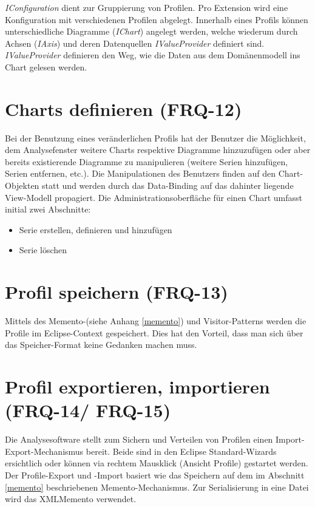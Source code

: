\textit{IConfiguration} dient zur Gruppierung von Profilen. Pro Extension wird eine Konfiguration mit verschiedenen Profilen abgelegt. Innerhalb eines Profils können unterschiedliche Diagramme (\textit{IChart}) angelegt werden, welche wiederum durch Achsen (\textit{IAxis}) und deren Datenquellen \textit{IValueProvider} definiert sind. \textit{IValueProvider} definieren den Weg, wie die Daten aus dem Domänenmodell ins Chart gelesen werden.

\section{Charts definieren (FRQ-12)}
Bei der Benutzung eines veränderlichen Profils hat der Benutzer die Möglichkeit, dem Analysefenster weitere Charts respektive Diagramme hinzuzufügen oder aber bereits existierende Diagramme zu manipulieren (weitere Serien hinzufügen, Serien entfernen, etc.). Die Manipulationen des Benutzers finden auf den Chart-Objekten statt und werden durch das Data-Binding auf das dahinter liegende View-Modell propagiert. Die Administrationsoberfläche für einen Chart umfasst initial zwei Abschnitte:
\begin{itemize}
	\item Serie erstellen, definieren und hinzufügen
	 \item Serie löschen
\end{itemize}

\section{Profil speichern (FRQ-13)}
Mittels des Memento-(siehe Anhang \ref{memento}) und Visitor-Patterns\cite[S. 331]{gamma1995design} werden die Profile im Eclipse-Context gespeichert. Dies hat den Vorteil, dass man sich über das Speicher-Format keine Gedanken machen muss.

\section{Profil exportieren, importieren (FRQ-14/ FRQ-15)}
Die Analysesoftware stellt zum Sichern und Verteilen von Profilen einen Import-Export-Mechanismus bereit. Beide sind in den Eclipse Standard-Wizards ersichtlich oder können via rechtem Mausklick (Ansicht Profile) gestartet werden. Der Profile-Export und -Import basiert wie das Speichern auf dem im Abschnitt \ref{memento} beschriebenen Memento-Mechanismus. Zur Serialisierung in eine Datei wird das XMLMemento verwendet. 

